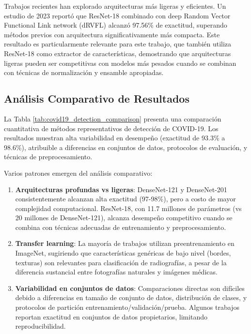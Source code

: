 Trabajos recientes han explorado arquitecturas más ligeras y eficientes. Un estudio de 2023 reportó que ResNet-18 combinado con deep Random Vector Functional Link network (dRVFL) alcanzó 97.56\% de exactitud, superando métodos previos con arquitectura significativamente más compacta. Este resultado es particularmente relevante para este trabajo, que también utiliza ResNet-18 como extractor de características, demostrando que arquitecturas ligeras pueden ser competitivas con modelos más pesados cuando se combinan con técnicas de normalización y ensamble apropiadas.

\subsection{Análisis Comparativo de Resultados}



La Tabla \ref{tab:covid19_detection_comparison} presenta una comparación cuantitativa de métodos representativos de detección de COVID-19. Los resultados muestran alta variabilidad en desempeño (exactitud de 93.3\% a 98.6\%), atribuible a diferencias en conjuntos de datos, protocolos de evaluación, y técnicas de preprocesamiento.

Varios patrones emergen del análisis comparativo:

\begin{enumerate}
\item \textbf{Arquitecturas profundas vs ligeras}: DenseNet-121 y DenseNet-201 consistentemente alcanzan alta exactitud (97-98\%), pero a costo de mayor complejidad computacional. ResNet-18, con 11.7 millones de parámetros (vs 20 millones de DenseNet-121), alcanza desempeño competitivo cuando se combina con técnicas adecuadas de entrenamiento y preprocesamiento.

\item \textbf{Transfer learning}: La mayoría de trabajos utilizan preentrenamiento en ImageNet, sugiriendo que características genéricas de bajo nivel (bordes, texturas) son relevantes para clasificación de radiografías, a pesar de la diferencia sustancial entre fotografías naturales y imágenes médicas.

\item \textbf{Variabilidad en conjuntos de datos}: Comparaciones directas son difíciles debido a diferencias en tamaño de conjunto de datos, distribución de clases, y protocolos de partición entrenamiento/validación/prueba. Algunos trabajos reportan exactitud en conjuntos de datos propietarios, limitando reproducibilidad.
\end{enumerate}


